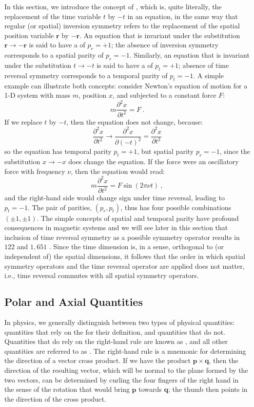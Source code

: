 In this section, we introduce the concept of , which is, quite literally, the replacement of the time variable $t$ by $-t$ in an equation, in the same way that regular (or spatial) inversion symmetry refers to the replacement of the spatial position variable $\mathbf{r}$ by $-\mathbf{r}$. An equation that is invariant under the substitution $\mathbf{r}\rightarrow-\mathbf{r}$ is said to have a  of $p_{r}=+1$; the absence of inversion symmetry corresponds to a spatial parity of $p_{r}=-1$.  Similarly, an equation that is invariant under the substitution $t\rightarrow -t$ is said to have a  of $p_t=+1$; absence of time reversal symmetry corresponds to a temporal parity of $p_t=-1$.  A simple example can  illustrate both concepts: consider Newton's equation of motion for a 1-D system with mass $m$, position $x$, and subjected to a constant force $F$:
\[
	m\frac{\partial^2 x}{\partial t^2} = F\ .
\]
If we replace $t$ by $-t$, then the equation does not change, because:
\[
	\frac{\partial^2 x}{\partial t^2}\rightarrow \frac{\partial^2 x}{\partial (-t)^2} =\frac{\partial^2 x}{\partial t^2}
\]
so the equation has temporal parity $p_t=+1$, but spatial parity $p_r=-1$, since the substitution $x\rightarrow -x$ does change the equation. If the force were an oscillatory force with frequency $\nu$, then the equation would read:
\[
	m\frac{\partial^2 x}{\partial t^2} = F \sin(2\pi\nu t)\ ,
\]
and the right-hand side would change sign under time reversal, leading to $p_t=-1$.  The pair of parities, $(p_r,p_t)$, thus has four possible combinations $(\pm 1, \pm 1)$.  The simple concepts of spatial and temporal parity have profound consequences in magnetic systems and we will see later in this section that inclusion of time reversal symmetry as a possible symmetry operator results in  $122$  and $1,651$ .  Since the time dimension is, in a sense, orthogonal to (or independent of) the spatial dimensions, it follows that the order in which spatial symmetry operators and the time reversal operator are applied does not matter, i.e., time reversal commutes with all spatial symmetry operators.


\subsection{Polar and Axial Quantities}\label{\chabbr:ssec:polaraxial}
In physics, we generally distinguish between two types of physical quantities: quantities that rely on the  for their definition, and quantities that do not.  Quantities that do rely on the right-hand rule are known as , and all other quantities are referred to as .  The right-hand rule is a mnemonic for determining the direction of a vector cross product. If we have the product $\mathbf{p}\times\mathbf{q}$, then the direction of the resulting vector, which will be normal to the plane formed by the two vectors, can be determined by curling the four fingers of the right hand in the sense of the rotation that would bring $\mathbf{p}$ towards $\mathbf{q}$; the thumb then points in the direction of the cross product.  

